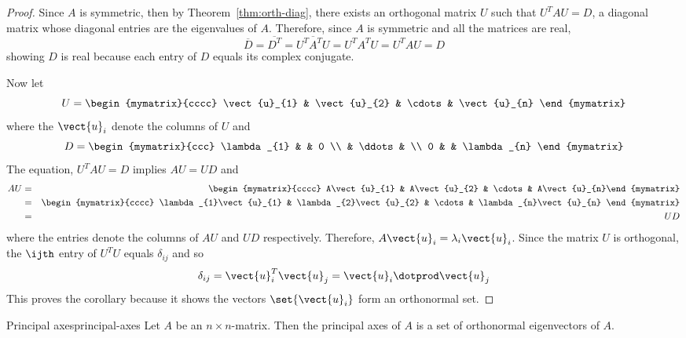 \begin{proof}
Since $A$ is symmetric, then by Theorem~\ref{thm:orth-diag},
there exists an orthogonal matrix $U$ such that $U^{T}AU=D$, a diagonal
matrix whose diagonal entries are the eigenvalues of $A$. Therefore, since $
A $ is symmetric and all the matrices are real,
\begin{equation*}
\overline{D}=\overline{D^{T}}=\overline{U^{T}A^{T}U}=U^{T}A^{T}U=U^{T}AU=D
\end{equation*}
showing $D$ is real because each entry of $D$ equals its complex conjugate.

Now let
\begin{equation*}
U=\begin{mymatrix}{cccc}
\vect{u}_{1} & \vect{u}_{2} & \cdots & \vect{u}_{n}
\end{mymatrix}
\end{equation*}
where the $\vect{u}_{i}$ denote the columns of $U$ and
\begin{equation*}
D=\begin{mymatrix}{ccc}
\lambda _{1} &  & 0 \\
& \ddots &  \\
0 &  & \lambda _{n}
\end{mymatrix}
\end{equation*}
The equation, $U^{T}AU=D$ implies $AU = UD$ and
\begin{eqnarray*}
AU &=&\begin{mymatrix}{cccc}
A\vect{u}_{1} & A\vect{u}_{2} & \cdots & A\vect{u}_{n}%
\end{mymatrix} \\
&=&\begin{mymatrix}{cccc}
\lambda _{1}\vect{u}_{1} & \lambda _{2}\vect{u}_{2} & \cdots & \lambda
_{n}\vect{u}_{n}
\end{mymatrix} \\
&=& UD
\end{eqnarray*}
where the entries denote the columns of $AU$ and $UD$ respectively.
Therefore, $A\vect{u}_{i}=\lambda _{i}\vect{u}_{i}$.  Since the matrix $U$
is orthogonal, the $\ijth$ entry of $U^{T}U$ equals $\delta _{ij}$ and so
\begin{equation*}
\delta _{ij}=\vect{u}_{i}^{T}\vect{u}_{j}=\vect{u}_{i}\dotprod \vect{u}
_{j}
\end{equation*}
This proves the corollary because it shows the vectors $\set{\vect{u}
_{i}} $ form an orthonormal set.
\end{proof}

\begin{definition}{Principal axes}{principal-axes}
Let $A$ be an $n \times n$-matrix. Then the principal axes of $A$ is a set of orthonormal eigenvectors of $A$.
\end{definition}

